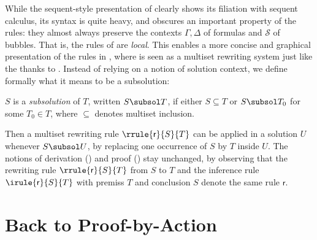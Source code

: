 While the sequent-style presentation of  clearly shows its filiation
with sequent calculus, its syntax is quite heavy, and obscures an important
property of the rules: they almost always preserve the contexts $\Gamma, \Delta$
of formulas and $\mathcal{S}$ of bubbles. That is, the rules of  are
\emph{local}. This enables a more concise and graphical presentation of the
rules in , where  is seen as a multiset rewriting
system just like the {\cham} thanks to . Instead of relying on
a notion of solution context, we define formally what it means to be a
subsolution:

\begin{definition}[Subsolution]
  $S$ is a \emph{subsolution} of $T$, written $S \subsol T$, if either $S
  \subseteq T$ or $S \subsol T_0$ for some $T_0 \in T$, where $\subseteq$
  denotes multiset inclusion. 
\end{definition}

Then a multiset rewriting rule $\rrule{\mathsf{r}}{S}{T}$ can be applied in a
solution $U$ whenever $S \subsol U$, by replacing one occurrence of $S$ by $T$
inside $U$. The notions of derivation () and proof
() stay unchanged, by observing that the rewriting rule
$\rrule{\mathsf{r}}{S}{T}$ from $S$ to $T$ and the inference rule
$\irule{\mathsf{r}}{S}{T}$ with premiss $T$ and conclusion $S$ denote the same
rule $\mathsf{r}$.



\section{Back to Proof-by-Action}


